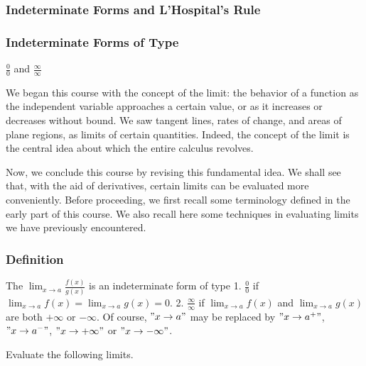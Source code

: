 \documentclass[
  letterpaper,
  DIV=11,
  numbers=noendperiod]{scrartcl}
\begin{document}
\hypertarget{indeterminate-forms-and-lhospitals-rule}{%
\subsubsection{Indeterminate Forms and L'Hospital's
Rule}\label{indeterminate-forms-and-lhospitals-rule}}

\hypertarget{htm:Indeterminateforms}{}
\hypertarget{indeterminate-forms-of-type}{%
\subsubsection{Indeterminate Forms of
Type}\label{indeterminate-forms-of-type}}

\(\frac{0}{0}\) and \(\frac{\infty}{\infty}\)

We began this course with the concept of the limit: the behavior of a
function as the independent variable approaches a certain value, or as
it increases or decreases without bound. We saw tangent lines, rates of
change, and areas of plane regions, as limits of certain quantities.
Indeed, the concept of the limit is the central idea about which the
entire calculus revolves.

Now, we conclude this course by revising this fundamental idea. We shall
see that, with the aid of derivatives, certain limits can be evaluated
more conveniently. Before proceeding, we first recall some terminology
defined in the early part of this course. We also recall here some
techniques in evaluating limits we have previously encountered.

\hypertarget{def:Definition}{}
\hypertarget{definition}{%
\subsubsection{Definition}\label{definition}}

The \(\displaystyle\lim_{x \to a} \frac{f(x)}{g(x)}\) is an
indeterminate form of type 1. \(\frac{0}{0}\) if
\(\displaystyle\lim_{x \to a} f(x) = \displaystyle\lim_{x \to a} g(x)=0\).
2. \(\frac{\infty}{\infty}\) if \(\displaystyle\lim_{x \to a} f(x)\) and
\(\displaystyle\lim_{x \to a} g(x)\) are both \(+\infty\) or
\(-\infty\). Of course, \("x \to a"\) may be replaced by
\("x \to a^+"\), \("x \to a^-"\), \("x \to +\infty"\) or
\("x \to -\infty"\).

\leavevmode{}%
Evaluate the following limits.
\end{document}
